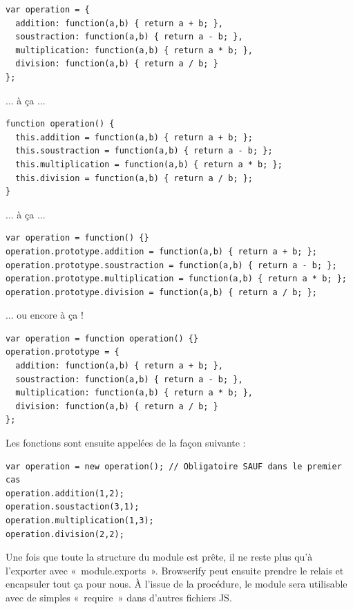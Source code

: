 \documentclass[a4paper,12pt]{article}
\begin{document}
\begin{lstlisting}
var operation = {
  addition: function(a,b) { return a + b; },
  soustraction: function(a,b) { return a - b; },
  multiplication: function(a,b) { return a * b; },
  division: function(a,b) { return a / b; }
};
\end{lstlisting}

\newpage

... à ça ...

\begin{lstlisting}
function operation() {
  this.addition = function(a,b) { return a + b; };
  this.soustraction = function(a,b) { return a - b; };
  this.multiplication = function(a,b) { return a * b; };
  this.division = function(a,b) { return a / b; };
}
\end{lstlisting}

... à ça ...

\begin{lstlisting}
var operation = function() {}
operation.prototype.addition = function(a,b) { return a + b; };
operation.prototype.soustraction = function(a,b) { return a - b; };
operation.prototype.multiplication = function(a,b) { return a * b; };
operation.prototype.division = function(a,b) { return a / b; };
\end{lstlisting}

... ou encore à ça !

\begin{lstlisting}
var operation = function operation() {}
operation.prototype = {
  addition: function(a,b) { return a + b; },
  soustraction: function(a,b) { return a - b; },
  multiplication: function(a,b) { return a * b; },
  division: function(a,b) { return a / b; }
};
\end{lstlisting}

Les fonctions sont ensuite appelées de la façon suivante :

\begin{lstlisting}
var operation = new operation(); // Obligatoire SAUF dans le premier cas
operation.addition(1,2);
operation.soustaction(3,1);
operation.multiplication(1,3);
operation.division(2,2);
\end{lstlisting}

Une fois que toute la structure du module est prête, il ne reste plus qu'à l'exporter avec «~module.exports~». Browserify peut ensuite prendre le relais et encapsuler tout ça pour nous. À l'issue de la procédure, le module sera utilisable avec de simples «~require~» dans d'autres fichiers JS.
\end{document}
